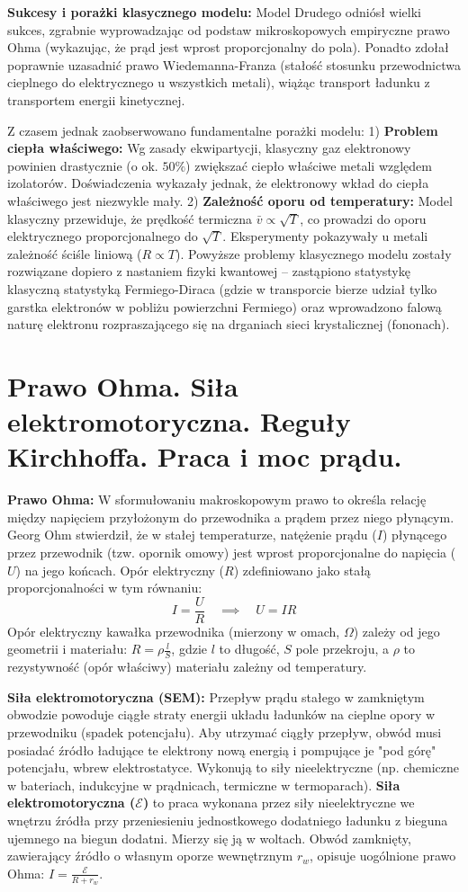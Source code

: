 \documentclass[11pt, a4paper]{article}
\begin{document}
\textbf{Sukcesy i porażki klasycznego modelu:}
Model Drudego odniósł wielki sukces, zgrabnie wyprowadzając od podstaw mikroskopowych empiryczne prawo Ohma (wykazując, że prąd jest wprost proporcjonalny do pola). Ponadto zdołał poprawnie uzasadnić prawo Wiedemanna-Franza (stałość stosunku przewodnictwa cieplnego do elektrycznego u wszystkich metali), wiążąc transport ładunku z transportem energii kinetycznej.

Z czasem jednak zaobserwowano fundamentalne porażki modelu:
1) \textbf{Problem ciepła właściwego:} Wg zasady ekwipartycji, klasyczny gaz elektronowy powinien drastycznie (o ok. $50\%$) zwiększać ciepło właściwe metali względem izolatorów. Doświadczenia wykazały jednak, że elektronowy wkład do ciepła właściwego jest niezwykle mały.
2) \textbf{Zależność oporu od temperatury:} Model klasyczny przewiduje, że prędkość termiczna $\bar{v} \propto \sqrt{T}$, co prowadzi do oporu elektrycznego proporcjonalnego do $\sqrt{T}$. Eksperymenty pokazywały u metali zależność ściśle liniową ($R \propto T$).
Powyższe problemy klasycznego modelu zostały rozwiązane dopiero z nastaniem fizyki kwantowej – zastąpiono statystykę klasyczną statystyką Fermiego-Diraca (gdzie w transporcie bierze udział tylko garstka elektronów w pobliżu powierzchni Fermiego) oraz wprowadzono falową naturę elektronu rozpraszającego się na drganiach sieci krystalicznej (fononach).

\section{Prawo Ohma. Siła elektromotoryczna. Reguły Kirchhoffa. Praca i moc prądu.}

\textbf{Prawo Ohma:}
W sformułowaniu makroskopowym prawo to określa relację między napięciem przyłożonym do przewodnika a prądem przez niego płynącym. Georg Ohm stwierdził, że w stałej temperaturze, natężenie prądu ($I$) płynącego przez przewodnik (tzw. opornik omowy) jest wprost proporcjonalne do napięcia ($U$) na jego końcach. Opór elektryczny ($R$) zdefiniowano jako stałą proporcjonalności w tym równaniu:
\[
I = \frac{U}{R} \quad \implies \quad U = I R
\]
Opór elektryczny kawałka przewodnika (mierzony w omach, $\Omega$) zależy od jego geometrii i materiału: $R = \rho \frac{l}{S}$, gdzie $l$ to długość, $S$ pole przekroju, a $\rho$ to rezystywność (opór właściwy) materiału zależny od temperatury.

\textbf{Siła elektromotoryczna (SEM):}
Przepływ prądu stałego w zamkniętym obwodzie powoduje ciągłe straty energii układu ładunków na cieplne opory w przewodniku (spadek potencjału). Aby utrzymać ciągły przepływ, obwód musi posiadać źródło ładujące te elektrony nową energią i pompujące je "pod górę" potencjału, wbrew elektrostatyce. Wykonują to siły nieelektryczne (np. chemiczne w bateriach, indukcyjne w prądnicach, termiczne w termoparach).
\textbf{Siła elektromotoryczna ($\mathcal{E}$)} to praca wykonana przez siły nieelektryczne we wnętrzu źródła przy przeniesieniu jednostkowego dodatniego ładunku z bieguna ujemnego na biegun dodatni. Mierzy się ją w woltach. Obwód zamknięty, zawierający źródło o własnym oporze wewnętrznym $r_w$, opisuje uogólnione prawo Ohma: $I = \frac{\mathcal{E}}{R + r_w}$.
\end{document}
